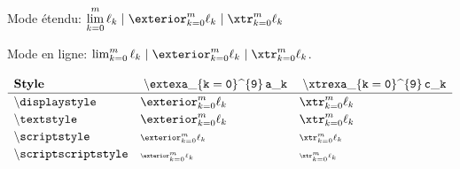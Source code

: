 \documentclass[varwidth, border = 8pt]{standalone}
\newcommand\exasep{\kern3pt | \kern3pt}
\newcommand\limexa{\lim_{k = 0}^{m} \ell_k}
\newcommand\xtrexa{\xtr_{k = 0}^{m} \ell_k}
\newcommand\extexa{\exterior_{k = 0}^{m} \ell_k}
\newcommand{\test}{\extexa}
\newcommand{\verbtest}%
           {\mathmacro{extexa}\_\{k = 0\}\text{\textasciicircum}\{9\} \, a\_k}
\newcommand{\testbis}{\xtrexa}
\newcommand{\verbtestbis}%
           {\mathmacro{xtrexa}\_\{k = 0\}\text{\textasciicircum}\{9\} \, c\_k}
\newcommand{\testmathstyle}{
  \[
    \renewcommand{\arraystretch}{1.2}%
    \begin{array}{lll}
        \textbf{Style}
      & \mathtt{\verbtest}
      & \mathtt{\verbtestbis}
      \\ \hline
        \mathtt{\backslash displaystyle}
      & \displaystyle \test
      & \displaystyle \testbis
      \\
        \mathtt{\backslash textstyle}
      & \textstyle \test
      & \textstyle \testbis
      \\
        \mathtt{\backslash scriptstyle}
      & \scriptstyle \test
      & \scriptstyle \testbis
      \\
        \mathtt{\backslash scriptscriptstyle}
      & \scriptscriptstyle \test
      & \scriptscriptstyle \testbis
    \end{array}
  \]
}
\begin{document}
Mode étendu:
$\displaystyle \limexa \exasep \extexa \exasep \xtrexa$

Mode en ligne:
$\limexa \exasep \extexa \exasep \xtrexa$.

\testmathstyle
\end{document}
